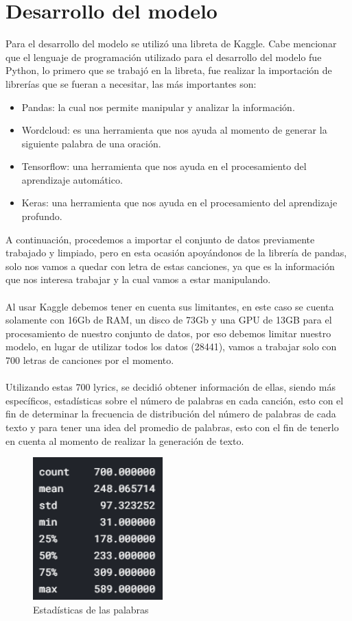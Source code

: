 \documentclass[12pt, a4paper, titlepage]{article}
\begin{document}
	\section{Desarrollo del modelo}
	Para el desarrollo del modelo se utilizó una libreta de Kaggle. Cabe mencionar que el lenguaje de programación utilizado para el desarrollo del modelo fue Python, lo primero que se trabajó en la libreta, fue realizar la importación de librerías que se fueran a necesitar, las más importantes son:	
	\begin{itemize}
		\item Pandas: la cual nos permite manipular y analizar la información.
		\item Wordcloud: es una herramienta que nos ayuda al momento de generar la siguiente palabra de una oración.
		\item Tensorflow: una herramienta que nos ayuda en el procesamiento del aprendizaje automático.
		\item Keras: una herramienta que nos ayuda en el procesamiento del aprendizaje profundo.
	\end{itemize}
	A continuación, procedemos a importar el conjunto de datos previamente trabajado y limpiado, pero en esta ocasión apoyándonos de la librería de pandas, solo nos vamos a quedar con letra de estas canciones, ya que es la información que nos interesa trabajar y la cual vamos a estar manipulando.\\\\
	Al usar Kaggle debemos tener en cuenta sus limitantes, en este caso se cuenta solamente con 16Gb de RAM, un disco de 73Gb y una GPU de 13GB para el procesamiento de nuestro conjunto de datos, por eso debemos limitar nuestro modelo, en lugar de utilizar todos los datos (28441), vamos a trabajar solo con 700 letras de canciones por el momento.\\\\
	Utilizando estas 700 lyrics, se decidió obtener información de ellas, siendo más específicos, estadísticas sobre el número de palabras en cada canción, esto con el fin de determinar la frecuencia de distribución del número de palabras de cada texto y para tener una idea del promedio de palabras, esto con el fin de tenerlo en cuenta al momento de realizar la generación de texto.
	\begin{figure}[H]
		\includegraphics[width=5cm]{./Imagenes/Modelo/estadistica.png}
		\centering 
		\caption{Estadísticas de las palabras}
	\end{figure}
\end{document}
